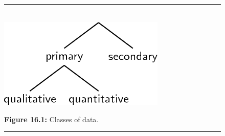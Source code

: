 	\begin{figure}[H] %
    \begin{center}
    \rule[.1in]{\figurerulewidth}{.005in} \\
        \label{m39403*uid3!!!underscore!!!media}\label{m39403*uid3!!!underscore!!!printimage}\includegraphics[width=300px]{col11306.imgs/m39403_MG10C16_001.png} %
      \vspace{2pt}
    \vspace{\rubberspace}\par \begin{cnxcaption}
	  \small \textbf{Figure 16.1: }Classes of data.
	\end{cnxcaption}
    \vspace{.1in}
    \rule[.1in]{\figurerulewidth}{.005in} \\
    \end{center}
 \end{figure}       
